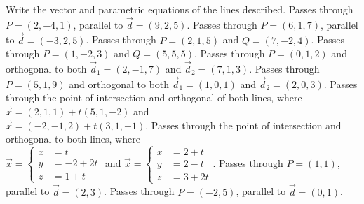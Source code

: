 
\begin{Exercise}[
name={},
title={}, 
difficulty=0,
origin={\cite{GHC}}]
Write the vector and parametric equations of the lines described.
\Question Passes through $P=(2,-4,1)$, parallel to $\vec d=(9,2,5)$.
\Question Passes through $P=(6,1,7)$, parallel to $\vec d=(-3,2,5)$.
\Question Passes through $P=(2,1,5)$ and $Q = (7,-2,4)$.
\Question Passes through $P=(1,-2,3)$ and $Q = (5,5,5)$.
\Question Passes through $P=(0,1,2)$ and orthogonal to both $\vec d_1=(2,-1,7)$ and $\vec d_2=(7,1,3)$.
\Question Passes through $P=(5,1,9)$ and orthogonal to both $\vec d_1=(1,0,1)$ and $\vec d_2=(2,0,3)$.
\Question Passes through the point of intersection and orthogonal of both lines, where
$\vec x = (2,1,1) + t(5,1,-2)$ and \\$\vec x = (-2,-1,2)+t(3,1,-1)$.
\Question Passes through the point of intersection and orthogonal to both lines, where\\
$\vec x = \left\{\begin{aligned} x&=t\\y&=-2+2t\\z&=1+t\end{aligned}\right.$ \quad and \quad 
$\vec x = \left\{\begin{aligned} x&=2+t\\y&=2-t\\z&=3+2t\end{aligned}\right.$.
\Question Passes through $P=(1,1)$, parallel to $\vec d = (2,3)$.
\Question Passes through $P=(-2,5)$, parallel to $\vec d = (0,1)$.
\end{Exercise}
